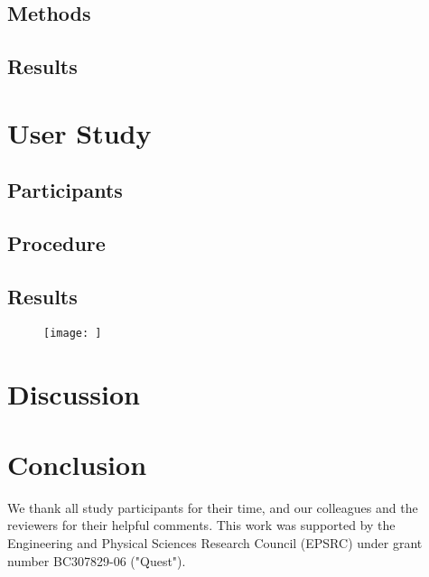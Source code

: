 \documentclass[manuscript,screen,review]{acmart}
\begin{document}
\subsection{Methods}

\subsection{Results}


\section{User Study}

\subsection{Participants}

\subsection{Procedure}

\subsection{Results}

\begin{figure}[h]
  \centering
  \texttt{[image: ]}
  \caption{}
  \Description{}
\end{figure}


\section{Discussion}

\section{Conclusion}

\begin{acks}
We thank all study participants for their time, and our colleagues and the reviewers for their helpful comments.
This work was supported by the Engineering and Physical Sciences Research Council (EPSRC) under grant number BC307829-06 ("Quest").
\end{acks}




\appendix
\end{document}
